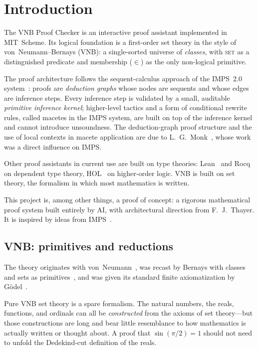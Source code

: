\chapter{Introduction}

\begin{sloppypar}The VNB Proof Checker is an interactive proof assistant implemented in
MIT~Scheme.  Its logical foundation is a first-order set theory in the
style of von~Neumann--Bernays (VNB): a single-sorted universe of
\emph{classes}, with \textsc{set} as a distinguished predicate and
membership ($\in$) as the only non-logical primitive.\end{sloppypar}

The proof architecture follows the sequent-calculus approach of the
IMPS~2.0 system~\cite{IMPS}: proofs are \emph{deduction graphs} whose
nodes are sequents and whose edges are inference steps.  Every
inference step is validated by a small, auditable \emph{primitive
inference kernel}; higher-level tactics and a form of conditional
rewrite rules, called macetes in the IMPS system, are built on top of
the inference kernel and cannot introduce unsoundness.
The deduction-graph proof structure and the use of local contexts in
macete application are due to L.~G.~Monk~\cite{Monk1988}, whose work
was a direct influence on IMPS.

Other proof assistants in current use are built on type theories:
Lean~\cite{Lean} and Rocq~\cite{Rocq} on dependent type theory,
HOL~\cite{HOL} on higher-order logic.  VNB is built on set theory, the
formalism in which most mathematics is written.

This project is, among other things, a proof of concept: a rigorous
mathematical proof system built entirely by AI,
with architectural direction from F.~J.~Thayer.  It is inspired by
ideas from IMPS~\cite{IMPS}.

\section{VNB: primitives and reductions}
\label{sec:primitives}

The theory originates with von~Neumann~\cite{vonNeumann1925}, was recast
by Bernays with classes and sets as primitives~\cite{Bernays1937}, and was
given its standard finite axiomatization by
G\"odel~\cite{Godel1940}.

Pure VNB set theory is a spare formalism.  The natural numbers, the
reals, functions, and ordinals can all be \emph{constructed} from the
axioms of set theory---but those constructions are long and bear little
resemblance to how mathematics is actually written or thought
about.  A proof that $\sin(\pi/2) = 1$ should not need to unfold the
Dedekind-cut definition of the reals.

